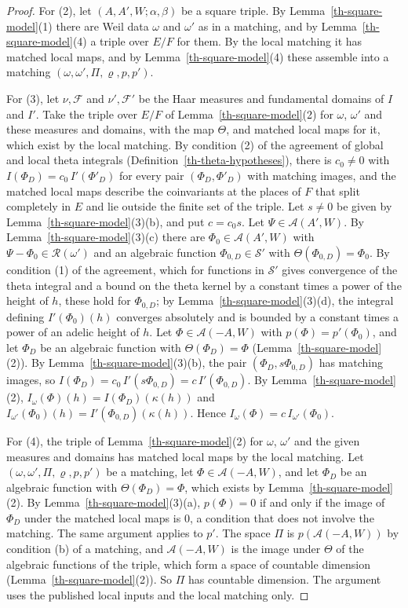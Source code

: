 \begin{proof}
For (2), let $(A,A',W;\alpha,\beta)$ be a square triple. By
Lemma~\ref{th-square-model}(1) there are Weil data $\omega$ and $\omega'$ as
in a matching, and by Lemma~\ref{th-square-model}(4) a triple over $E/F$ for
them. By the local matching it has matched local maps, and by
Lemma~\ref{th-square-model}(4) these assemble into a matching
$(\omega,\omega',\Pi,\varrho,p,p')$.

For (3), let $\nu,\mathcal F$ and $\nu',\mathcal F'$ be the Haar measures and
fundamental domains of $I$ and $I'$. Take the triple over $E/F$ of
Lemma~\ref{th-square-model}(2) for $\omega$, $\omega'$ and these measures and
domains, with the map $\Theta$, and matched local maps for it, which exist by
the local matching. By condition (2) of the agreement of global and local
theta integrals (Definition~\ref{th-theta-hypotheses}), there is $c_0\neq0$
with $I(\Phi_D)=c_0\,I'(\Phi'_D)$ for every pair $(\Phi_D,\Phi'_D)$ with
matching images, and the matched local maps describe the coinvariants at the
places of $F$ that split completely in $E$ and lie outside the finite set of
the triple. Let $s\neq0$ be given by Lemma~\ref{th-square-model}(3)(b), and put
$c=c_0s$. Let $\Psi\in\mathcal A(A',W)$. By
Lemma~\ref{th-square-model}(3)(c) there are $\Phi_0\in\mathcal A(A',W)$ with
$\Psi-\Phi_0\in\mathcal R(\omega')$ and an algebraic function
$\Phi_{0,D}\in\mathcal S'$ with $\Theta(\Phi_{0,D})=\Phi_0$. By condition (1)
of the agreement, which for functions in $\mathcal S'$ gives convergence of the
theta integral and a bound on the theta kernel by a constant times a power of
the height of $h$, these hold for $\Phi_{0,D}$; by
Lemma~\ref{th-square-model}(3)(d), the integral defining $I'(\Phi_0)(h)$
converges absolutely and is bounded by a constant times a power of an adelic
height of $h$. Let $\Phi\in\mathcal A(-A,W)$ with $p(\Phi)=p'(\Phi_0)$, and
let $\Phi_D$ be an algebraic function with $\Theta(\Phi_D)=\Phi$
(Lemma~\ref{th-square-model}(2)). By Lemma~\ref{th-square-model}(3)(b), the
pair $(\Phi_D,s\Phi_{0,D})$ has matching images, so
$I(\Phi_D)=c_0\,I'(s\Phi_{0,D})=c\,I'(\Phi_{0,D})$. By
Lemma~\ref{th-square-model}(2), $I_\omega(\Phi)(h)=I(\Phi_D)(\kappa(h))$ and
$I_{\omega'}(\Phi_0)(h)=I'(\Phi_{0,D})(\kappa(h))$. Hence
$I_\omega(\Phi)=c\,I_{\omega'}(\Phi_0)$.

For (4), the triple of Lemma~\ref{th-square-model}(2) for $\omega$, $\omega'$
and the given measures and domains has matched local maps by the local
matching. Let $(\omega,\omega',\Pi,\varrho,p,p')$ be a matching, let
$\Phi\in\mathcal A(-A,W)$, and let $\Phi_D$ be an algebraic function with
$\Theta(\Phi_D)=\Phi$, which exists by Lemma~\ref{th-square-model}(2). By
Lemma~\ref{th-square-model}(3)(a), $p(\Phi)=0$ if and only if the image of
$\Phi_D$ under the matched local maps is $0$, a condition that does not
involve the matching. The same argument applies to $p'$. The
space $\Pi$ is $p(\mathcal A(-A,W))$ by condition (b) of a matching, and
$\mathcal A(-A,W)$ is the image under $\Theta$ of the algebraic functions of
the triple, which form a space of countable dimension
(Lemma~\ref{th-square-model}(2)). So $\Pi$ has countable dimension. The
argument uses the published local inputs and the local matching only.


\end{proof}
